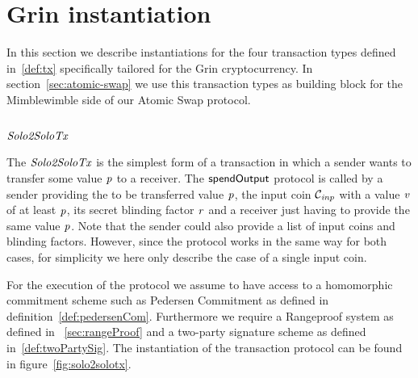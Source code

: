 \begin{definition}
    
\end{definition}

\section{Grin instantiation}\label{sec:atomic-inst}

In this section we describe instantiations for the four transaction types defined in~\ref{def:tx} specifically tailored for the Grin cryptocurrency. In section~\ref{sec:atomic-swap} we use this transaction types as building block for the Mimblewimble side of our Atomic Swap protocol.

\subsection{$\mathit{Solo2SoloTx}$}

The $\mathit{Solo2SoloTx}$ is the simplest form of a transaction in which a sender wants to transfer some value $\mathit{p}$ to a receiver. The $\mathsf{spendOutput}$ protocol is called by a sender providing the to be transferred value
$\mathit{p}$, the input coin $\mathcal{C}_{\mathit{inp}}$ with a value $\mathit{v}$ of at least $\mathit{p}$, its secret blinding factor $\mathit{r}$ and a receiver just having to provide the same value $\mathit{p}$. Note that the
sender could also provide a list of input coins and blinding factors. However, since the protocol works in the same way for both cases, for simplicity we here only describe the case of a single input coin.

For the execution of the protocol we assume to have access to a homomorphic commitment scheme such as Pedersen Commitment as defined in definition~\ref{def:pedersenCom}. Furthermore we require a Rangeproof system as defined in
~\ref{sec:rangeProof} and a two-party signature scheme as defined in~\ref{def:twoPartySig}. The instantiation of the transaction protocol can be found in figure~\ref{fig:solo2solotx}.


